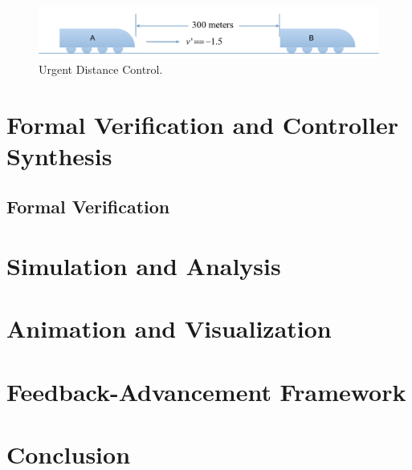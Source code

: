 \documentclass{WileySix}
\begin{document}
\begin{figure}
\centering
\includegraphics[width=0.7\linewidth]{./figs/distance}
\caption{Urgent Distance Control.}
\label{fig:distance}
\end{figure}


\part[Verification and Synthesis]{Formal Verification and Controller Synthesis}

\chapter{Formal Verification}

\part[Simulation and Analysis]{Simulation and Analysis}

\part[Animation and Visualization]{Animation and Visualization}

\part[Feedback-Advancement Framework]{Feedback-Advancement Framework}

\part{Conclusion}


\end{document}
